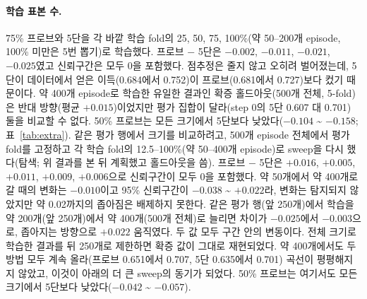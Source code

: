 \documentclass[11pt]{article}
\begin{document}
\paragraph{학습 표본 수.} 75\% 프로브와 5단을 각 바깥 학습 fold의 25, 50, 75, 100\%(약 50--200개 episode, 100\% 미만은 5번 뽑기)로 학습했다. 프로브 $-$ 5단은 $-0.002$, $-0.011$, $-0.021$, $-0.025$였고 신뢰구간은 모두 0을 포함했다. 점추정은 줄지 않고 오히려 벌어졌는데, 5단이 데이터에서 얻은 이득(0.684에서 0.752)이 프로브(0.681에서 0.727)보다 컸기 때문이다. 약 400개 episode로 학습한 유일한 결과인 확증 홀드아웃(500개 전체, 5-fold)은 반대 방향(평균 $+0.015$)이었지만 평가 집합이 달라(step 0의 5단 0.607 대 0.701) 둘을 비교할 수 없다. 50\% 프로브는 모든 크기에서 5단보다 낮았다($-0.104$ \textasciitilde{} $-0.158$; 표~\ref{tab:extra}). 같은 평가 행에서 크기를 비교하려고, 500개 episode 전체에서 평가 fold를 고정하고 각 학습 fold의 12.5--100\%(약 50--400개 episode)로 sweep을 다시 했다(탐색; 위 결과를 본 뒤 계획했고 홀드아웃을 씀). 프로브 $-$ 5단은 $+0.016$, $+0.005$, $+0.011$, $+0.009$, $+0.006$으로 신뢰구간이 모두 0을 포함했다. 약 50개에서 약 400개로 갈 때의 변화는 $-0.010$이고 95\% 신뢰구간이 $-0.038$ \textasciitilde{} $+0.022$라, 변화는 탐지되지 않았지만 약 0.02까지의 좁아짐은 배제하지 못한다. 같은 평가 행(앞 250개)에서 학습을 약 200개(앞 250개)에서 약 400개(500개 전체)로 늘리면 차이가 $-0.025$에서 $-0.003$으로, 좁아지는 방향으로 $+0.022$ 움직였다. 두 값 모두 구간 안의 변동이다. 전체 크기로 학습한 결과를 뒤 250개로 제한하면 확증 값이 그대로 재현되었다. 약 400개에서도 두 방법 모두 계속 올라(프로브 0.651에서 0.707, 5단 0.635에서 0.701) 곡선이 평평해지지 않았고, 이것이 아래의 더 큰 sweep의 동기가 되었다. 50\% 프로브는 여기서도 모든 크기에서 5단보다 낮았다($-0.042$ \textasciitilde{} $-0.057$).
\end{document}
